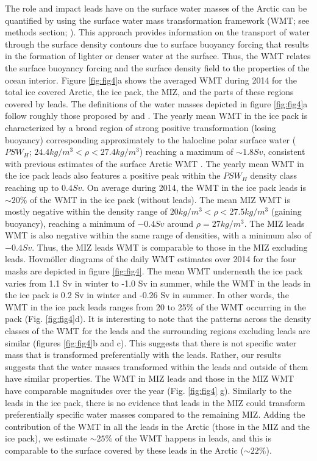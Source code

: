 \documentclass[lineno,sn-basic]{sn-jnl}%
\begin{document}
The role and impact leads have on the surface water masses of the Arctic can be quantified by using the surface water mass transformation framework (WMT; see methods section; \citealp{Walin_WMT_1982}). This approach provides information on the transport of water through the surface density contours due to surface buoyancy forcing that results in the formation of lighter or denser water at the surface. Thus, the WMT relates the surface buoyancy forcing and the surface density field to the properties of the ocean interior. 
Figure \ref{fig:fig4}a shows the averaged WMT during 2014 for the total ice covered Arctic, the ice pack, the MIZ, and the parts of these regions covered by leads. The definitions of the water masses depicted in figure \ref{fig:fig4}a follow roughly those proposed by \citealt{Pemberton_WMT_2015} and \citealt{Lansard_water_mass_2012}.
The yearly mean WMT in the ice pack is characterized by a broad region of strong positive transformation (losing buoyancy) corresponding approximately to the halocline polar surface water ($PSW_{H}$; $24.4 kg/m^3 < \rho < 27.4 kg/m^3$) reaching a maximum of $\sim 1.8 Sv$, consistent with previous estimates of the surface Arctic WMT \citep{Pemberton_WMT_2015}.
The yearly mean WMT in the ice pack leads also features a positive peak within the $PSW_{H}$ density class reaching up to $0.4 Sv$. On average during 2014, the WMT in the ice pack leads is $\sim 20\%$ of the WMT in the ice pack (without leads). The mean MIZ WMT is mostly negative within the density range of $20 kg/m^3 < \rho < 27.5 kg/m^3$ (gaining buoyancy), reaching a minimum of $-0.4 Sv$ around $\rho = 27 kg/m^3$. The MIZ leads WMT is also negative within the same range of densities, with a minimum also of $-0.4 Sv$. Thus, the MIZ leads WMT is comparable to those in the MIZ excluding leads. 
Hovm\"oller diagrams of the daily WMT estimates over 2014 for the four masks are depicted in figure \ref{fig:fig4}.
The mean WMT underneath the ice pack varies from 1.1 Sv in winter to -1.0 Sv in summer, while the WMT in the leads in the ice pack is 0.2 Sv in winter and -0.26 Sv in summer. In other words, the WMT in the ice pack leads ranges from 20 to 25\% of the WMT occurring in the pack (Fig. \ref{fig:fig4}d). It is interesting to note that the patterns across the density classes of the WMT for the leads and the surrounding regions excluding leads are similar (figures \ref{fig:fig4}b and c). This suggests that there is not specific water mass that is transformed preferentially with the leads. Rather, our results suggests that the water masses transformed within the leads and outside of them have similar properties. 
The WMT in MIZ leads and those in the MIZ WMT have comparable magnitudes over the year (Fig. \ref{fig:fig4} g). Similarly to the leads in the ice pack, there is no evidence that leads in the MIZ could transform preferentially specific water masses compared to the remaining MIZ. 
Adding the contribution of the WMT in all the leads in the Arctic (those in the MIZ and the ice pack), we estimate $\sim 25\%$ of the WMT happens in leads, and this is comparable to the surface covered by these leads in the Arctic ($\sim 22\%$). 
\end{document}
